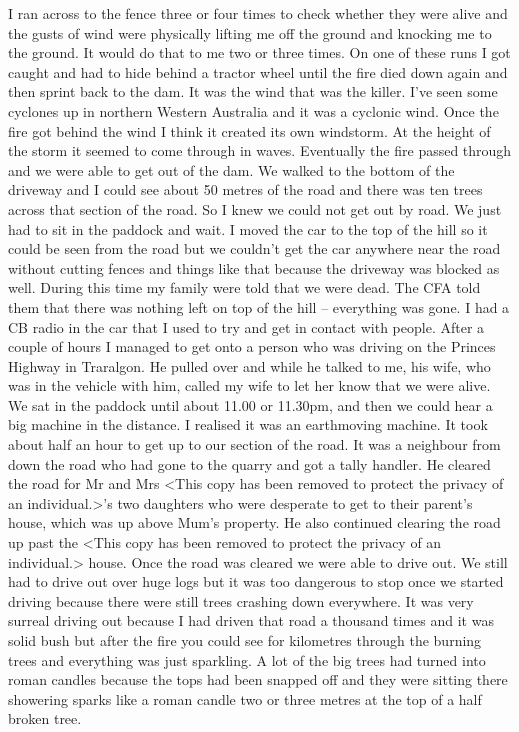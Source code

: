 \documentclass[a4paper]{article}
\begin{document}
        I ran across to the fence three or four times to check whether they were alive and the gusts of wind were physically lifting me off the ground and knocking me to the ground. It would do that to me two or three times. On one of these runs I got caught and had to hide behind a tractor wheel until the fire died down again and then sprint back to the dam. It was the wind that was the killer. I've seen some cyclones up in northern Western Australia and it was a cyclonic wind. Once the fire got behind the wind I think it created its own windstorm. At the height of the storm it seemed to come through in waves.
        Eventually the fire passed through and we were able to get out of the dam. We walked to the bottom of the driveway and I could see about 50 metres of the road and there was ten trees across that section of the road. So I knew we could not get out by road. We just had to sit in the paddock and wait. I moved the car to the top of the hill so it could be seen from the road but we couldn't get the car anywhere near the road without cutting fences and things like that because the driveway was blocked as well.
        During this time my family were told that we were dead. The CFA told them that there was nothing left on top of the hill – everything was gone.
        I had a CB radio in the car that I used to try and get in contact with people. After a couple of hours I managed to get onto a person who was driving on the Princes Highway in Traralgon. He pulled over and while he talked to me, his wife, who was in the vehicle with him, called my wife to let her know that we were alive.
        We sat in the paddock until about 11.00 or 11.30pm, and then we could hear a big machine in the distance. I realised it was an earthmoving machine. It took about half an hour to get up to our section of the road. It was a neighbour from down the road who had gone to the quarry and got a tally handler. He cleared the road for Mr and Mrs <This copy has been removed to protect the privacy of an individual.>'s two daughters who were desperate to get to their parent's house, which was up above Mum's property. He also continued clearing the road up past the <This copy has been removed to protect the privacy of an individual.> house.
        Once the road was cleared we were able to drive out. We still had to drive out over huge logs but it was too dangerous to stop once we started driving because there were still trees crashing down everywhere.
        It was very surreal driving out because I had driven that road a thousand times and it was solid bush but after the fire you could see for kilometres through the burning trees and everything was just sparkling. A lot of the big trees had turned into roman candles because the tops had been snapped off and they were sitting there showering sparks like a roman candle two or three metres at the top of a half broken tree.
\end{document}
